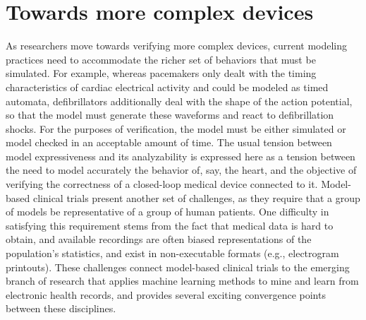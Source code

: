 \section{Towards more complex devices}
As researchers move towards verifying more complex devices, current modeling practices need to accommodate the richer set of behaviors that must be simulated.
For example, whereas pacemakers only dealt with the timing characteristics of cardiac electrical activity and could be modeled as timed automata, defibrillators additionally deal with the shape of the action potential, so that the model must generate these waveforms and react to defibrillation shocks.
For the purposes of verification, the model must be either simulated or model checked in an acceptable amount of time.
The usual tension between model expressiveness and its analyzability is expressed here as a tension between the need to model accurately the behavior of, say, the heart, and the objective of verifying the correctness of a closed-loop medical device connected to it.
Model-based clinical trials present another set of challenges, as they require that a group of models be representative of a group of human patients. 
One difficulty in satisfying this requirement stems from the fact that medical data is hard to obtain, and available recordings are often biased representations of the population's statistics, and exist in non-executable formats (e.g., electrogram printouts). 
These challenges connect model-based clinical trials to the emerging branch of research that applies machine learning methods to mine and learn from electronic health records, and provides several exciting convergence points between these disciplines.